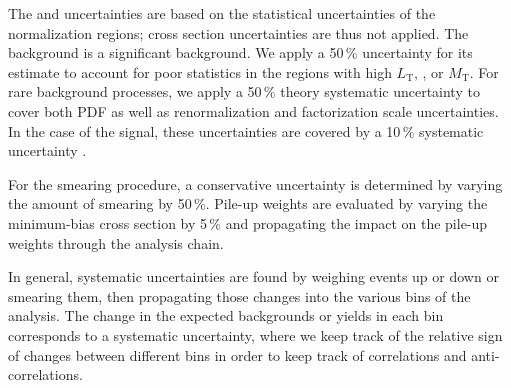 The \ZZ and \ttbar uncertainties are based on the statistical uncertainties of the normalization regions; cross section uncertainties are thus not applied. The \WZ background is a significant background. We apply a 50\,\% uncertainty for its estimate to account for poor statistics in the regions with high $L_\textrm{T}$, \MET, or $M_\textrm{T}$. For rare background processes, we apply a 50\,\% theory systematic uncertainty to cover both PDF as well as renormalization and factorization scale uncertainties. In the case of the signal, these uncertainties are covered by a 10\,\% systematic uncertainty \cite{CMS-PAS-EXO-14-001}.

For the \MET smearing procedure, a conservative uncertainty is determined by varying the amount of smearing by 50\,\%. Pile-up weights are evaluated by varying the minimum-bias cross section by 5\,\% and propagating the impact on the pile-up weights through the analysis chain.

In general, systematic uncertainties are found by weighing events up or down or smearing them, then propagating those changes into the various bins of the analysis. The change in the expected backgrounds or yields in each bin corresponds to a systematic uncertainty, where we keep track of the relative sign of changes between different bins in order to keep track of correlations and anti-correlations.

